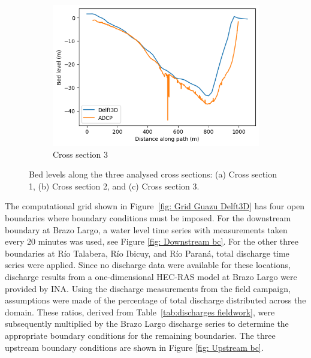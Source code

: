 \begin{figure}[H]
    \vspace{1em}
    \begin{subfigure}[t]{0.48\linewidth}
        \centering
        \includegraphics[width=\linewidth,height=0.8\linewidth,keepaspectratio]{figures/ch7/Bathymetry_cs3.png}
        \caption{Cross section 3}
        \label{fig:bathy_cs3}
    \end{subfigure}

    \caption{Bed levels along the three analysed cross sections: (a) Cross section 1, (b) Cross section 2, and (c) Cross section 3.}
    \label{fig:bathymetry_cross_sections}
\end{figure}

The computational grid shown in Figure~\ref{fig: Grid Guazu Delft3D} has four open boundaries where boundary conditions must be imposed. For the downstream boundary at Brazo Largo, a water level time series with measurements taken every 20 minutes was used, see Figure \ref{fig: Downstream bc}. For the other three boundaries at Río Talabera, Río Ibicuy, and Río Paraná, total discharge time series were applied. Since no discharge data were available for these locations, discharge results from a one-dimensional HEC-RAS model at Brazo Largo were provided by INA. Using the discharge measurements from the field campaign, assumptions were made of the percentage of total discharge distributed across the domain. These ratios, derived from Table~\ref{tab:discharges fieldwork}, were subsequently multiplied by the Brazo Largo discharge series to determine the appropriate boundary conditions for the remaining boundaries. The three upstream boundary conditions are shown in Figure \ref{fig: Upstream bc}.

